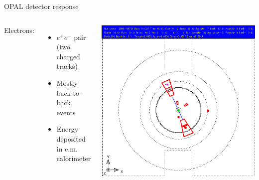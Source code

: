 \documentclass[11pt,xcolor=dvipsnames,professionalfonts]{beamer}
\begin{document}
\begin{frame}{OPAL detector response}
	\begin{columns}
		Electrons:
		\begin{itemize}
			\setlength\itemsep{.5em}
			\item $e^+e^-$ pair (two charged tracks)
			\item Mostly back-to-back events
			\item Energy deposited in e.m. calorimeter
		\end{itemize}
		\includegraphics[width=1.0\textwidth]{./talkfigs/pdf/ee_02.pdf}

	\end{columns}
\end{frame}
\end{document}
